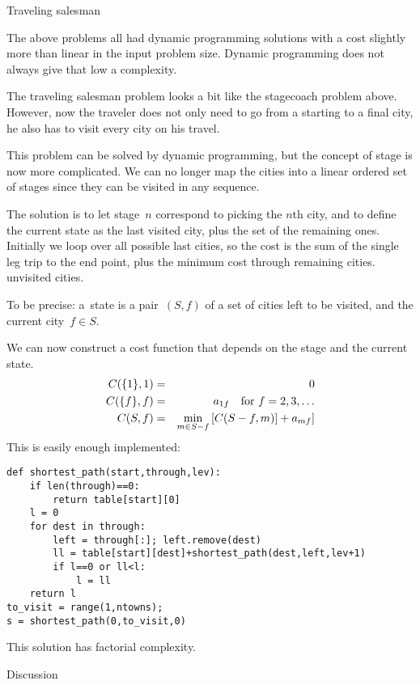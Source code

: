  {Traveling salesman}

The above problems all had dynamic programming solutions with a cost
slightly more than linear in the input problem size. Dynamic
programming does not always give that low a complexity.

The traveling salesman problem looks a bit like the stagecoach problem
above. However, now the traveler does not only need to go from a
starting to a final city, he also has to visit every city on his
travel.

This problem can be solved by dynamic programming, but the
concept of stage is now more complicated. We can no longer map the
cities into a linear ordered set of stages since they can be visited in
any sequence.

The solution is to let stage~$n$ correspond to picking the $n$th city,
and to define the current state as the last visited city, plus the set
of the remaining ones. Initially we loop over all possible last
cities, so the cost is the sum of the single leg trip to the end
point, plus the minimum cost through remaining cities.
unvisited cities.

To be precise: a~state is a pair~$(S,f)$ of a set of cities left to be
visited, and the current city~$f\in S$.

We can now construct a cost function that depends on the stage and the
current state.
\begin{eqnarray*}
C(\{1\},1)&=&0\\
C(\{f\},f)&=&a_{1f}\quad\hbox{for $f=2,3,\ldots$}\\
C(S,f)&=&\min_{m\in S-f}\left[C(S-f,m)]+a_{mf}\right]
\end{eqnarray*}
This is easily enough implemented:
\begin{verbatim}
def shortest_path(start,through,lev):
    if len(through)==0:
        return table[start][0]
    l = 0
    for dest in through:
        left = through[:]; left.remove(dest)
        ll = table[start][dest]+shortest_path(dest,left,lev+1)
        if l==0 or ll<l:
            l = ll
    return l
to_visit = range(1,ntowns);
s = shortest_path(0,to_visit,0)
\end{verbatim}
This solution has factorial complexity.

 {Discussion}

